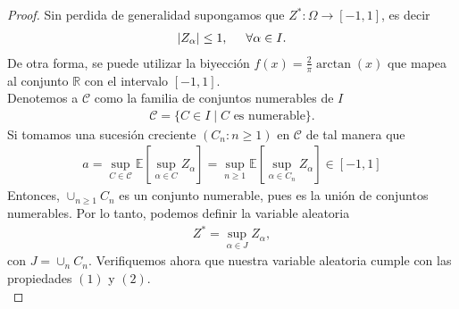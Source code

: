 \begin{proof}
Sin perdida de generalidad supongamos que $Z^{*} : \Omega \rightarrow [-1, 1]$, es decir
	\begin{align*}
	|Z_\alpha| \leq 1, \hspace{0.5cm} \forall \alpha \in I.
	\end{align*}
De otra forma, se puede utilizar la biyección $f(x) = \frac{2}{\pi} \arctan(x)$ que mapea al conjunto $\mathbb{R}$ con el intervalo $[-1, 1]$. \\

\noindent Denotemos a $\mathcal{C}$ como la familia de conjuntos numerables de $I$
	\begin{align*}
	\mathcal{C} = \{C \in I \mid C \text{ es numerable}\}.
	\end{align*}
Si tomamos una sucesión creciente $(C_n : n \geq 1)$ en $\mathcal{C}$ de tal manera que
	\begin{align*}
	a = \sup_{C \in \mathcal{C}} \mathbb{E} \left[ \sup_{\alpha \in C} Z_{\alpha} \right] = \sup_{n \geq 1} \mathbb{E} \left[ \sup_{\alpha \in C_n} Z_{\alpha} \right] \in [-1, 1]
	\end{align*}
Entonces, $\cup_{n \geq 1} C_n$ es un conjunto numerable, pues es la unión de conjuntos numerables. Por lo tanto, podemos definir la variable aleatoria
	\begin{align*}
	Z^{*} = \sup_{\alpha \in J} Z_\alpha,
	\end{align*}
con $J = \cup_n C_n$. Verifiquemos ahora que nuestra variable aleatoria cumple con las propiedades $(1)$ y $(2)$. \\


\end{proof}
